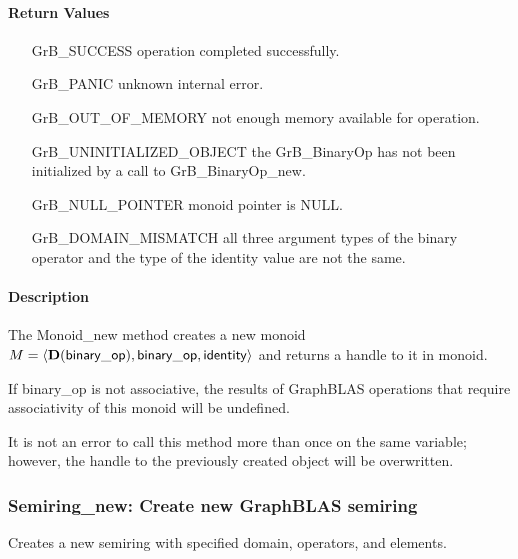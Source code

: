 \paragraph{Return Values}

\begin{itemize}[leftmargin=2.1in]
\item[{\sf GrB\_SUCCESS}]           operation completed successfully.
\item[{\sf GrB\_PANIC}]             unknown internal error.
\item[{\sf GrB\_OUT\_OF\_MEMORY}]   not enough memory available for operation.
\item[{\sf GrB\_UNINITIALIZED\_OBJECT}]  the {\sf GrB\_BinaryOp} has not been
                                    initialized by a call to {\sf GrB\_BinaryOp\_new}.
\item[{\sf GrB\_NULL\_POINTER}]     {\sf monoid} pointer is {\sf NULL}.
\item[{\sf GrB\_DOMAIN\_MISMATCH}]  all three argument types of the binary operator and
                                    the type of the identity value are not the same.
\end{itemize}

\paragraph{Description}

The {\sf Monoid\_new} method creates a new monoid $M = \langle \mathbf{D}({\sf binary\_op}), {\sf binary\_op}, 
{\sf identity} \rangle$ and returns a handle to it in {\sf monoid}.

If {\sf binary\_op} is not associative, the results of GraphBLAS operations that
require associativity of this monoid will be undefined.

It is not an error to call this method more than once on the same variable;  
however, the handle to the previously created object will be overwritten. 

\subsubsection{{\sf Semiring\_new}: Create new GraphBLAS semiring}

Creates a new semiring with specified domain, operators, and elements.

\paragraph{\syntax}

